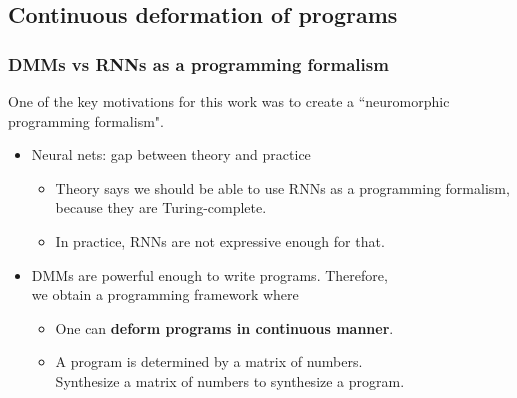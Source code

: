 \documentclass{beamer}
\newcommand{\msmagenta}[1]{{\color{mymagenta} #1}}
\begin{document}
\subsection{Continuous deformation of programs}

\begin{frame}

  \frametitle{\msmagenta{DMMs vs RNNs as a programming formalism}}

One of the key motivations for this work was to create a ``neuromorphic programming formalism".

\begin{itemize}
\item Neural nets: gap between theory and practice\\[1ex]

\begin{itemize}

\item Theory says we should be able to use RNNs as a programming formalism, because they are Turing-complete.\\[1ex]

\item In practice, RNNs are not expressive enough for that.\\[2ex]

\end{itemize}


\item DMMs are powerful enough  to write programs. Therefore,\\ we obtain a programming framework where\\[1ex]

\begin{itemize}

\item One can {\bf deform programs in continuous manner}.\\[1ex]

\item A program is determined by a matrix of numbers.\\
        Synthesize a matrix of numbers to synthesize a program.

\end{itemize}

\end{itemize}

\end{frame}
\end{document}
